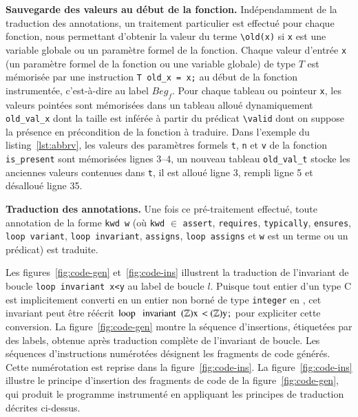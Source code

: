 \textbf{Sauvegarde des valeurs  au début de la fonction.}
Indépendamment de la traduction des annotations, un traitement particulier est
effectué pour chaque fonction, nous permettant d'obtenir la valeur
du terme \lstinline'\old(x)' si \lstinline'x' est une variable globale ou un
paramètre formel de la fonction.
Chaque valeur d'entrée \lstinline'x' (un paramètre formel de la fonction ou une
variable globale) de type $T$ est mémorisée par une instruction
\lstinline'T old_x = x;' au début de la fonction instrumentée, c'est-à-dire au
label $Beg_f$.
Pour chaque tableau ou pointeur \lstinline'x', les valeurs pointées sont
mémorisées dans un tableau alloué dynamiquement \lstinline'old_val_x' dont la
taille est inférée à partir du prédicat \lstinline'\valid' dont on suppose la
présence en précondition de la fonction à traduire.
Dans l'exemple du listing~\ref{lst:abbrv}, les valeurs des paramètres formels
\lstinline't', \lstinline'n' et \lstinline'v' de la fonction
\lstinline'is_present' sont mémorisées lignes 3--4, un
nouveau tableau \lstinline'old_val_t' stocke les anciennes valeurs contenues
dans \lstinline't', il est alloué ligne 3, rempli ligne 5 et désalloué ligne 35.

\textbf{Traduction des annotations.}
Une fois ce pré-traitement effectué, toute annotation \eacsl de la forme
\lstinline'kwd w' (où \lstinline'kwd' $\in$ \bopen \lstinline'assert',
\lstinline'requires', \lstinline'typically', \lstinline'ensures',
\lstinline'loop variant', \lstinline'loop invariant', \lstinline'assigns',
\lstinline'loop assigns' \bclose et \lstinline'w' est un terme ou un prédicat)
est traduite.





Les figures~\ref{fig:code-gen} et~\ref{fig:code-ins} illustrent la traduction
de l'invariant de boucle \lstinline'loop invariant x<y' au label de boucle $l$.
Puisque tout entier d'un type C est implicitement converti en un entier non
borné de type \lstinline'integer' en \eacsl, cet invariant peut être réécrit
$\mbox{\lstinline'loop invariant'}~(\mathbb{Z})\mbox{\lstinline'x <'}~(\mathbb{Z})\mbox{\lstinline'y;'}$ pour expliciter cette conversion.
La figure~\ref{fig:code-gen} montre la séquence d'insertions, étiquetées par
des labels, obtenue après traduction complète de l'invariant de boucle.
Les séquences d'instructions numérotées
 désignent les fragments de
code générés.
Cette numérotation est reprise dans la figure~\ref{fig:code-ins}.
La figure~\ref{fig:code-ins} illustre le principe d'insertion des fragments de
code de la figure~\ref{fig:code-gen}, qui produit le programme instrumenté en
appliquant les principes de traduction décrites ci-dessus.

